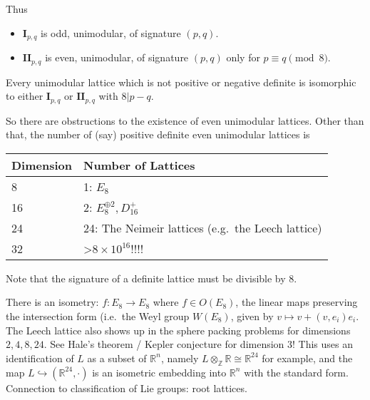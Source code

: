 \begin{remark}

Thus

\begin{itemize}
\tightlist
\item
  \(\mathbf{I}_{p, q}\) is odd, unimodular, of signature \((p, q)\).
\item
  \(\mathbf{II}_{p, q}\) is even, unimodular, of signature \((p, q)\)
  only for \(p \equiv q \pmod 8\).
\end{itemize}

\end{remark}

\begin{theorem}[Serre]

Every unimodular lattice which is not positive or negative definite is
isomorphic to either \(\mathbf{I}_{p, q}\) or \(\mathbf{II}_{p, q}\)
with \(8\mathrel{\Big|}p-q\).

\end{theorem}

\begin{remark}

So there are obstructions to the existence of even unimodular lattices.
Other than that, the number of (say) positive definite even unimodular
lattices is

\begin{longtable}[]{@{}ll@{}}
\toprule
Dimension & Number of Lattices \\
\midrule
\endhead
8 & 1: \(E_8\) \\
16 & 2: \(E_8^{\oplus 2}, D_{16}^+\) \\
24 & 24: The Neimeir lattices (e.g.~the Leech lattice) \\
32 & \textgreater{}\(8\times 10^{16}\)!!!! \\
\bottomrule
\end{longtable}

Note that the signature of a definite lattice must be divisible by 8.

\end{remark}

\begin{remark}

There is an isometry: \(f: E_8 \to E_8\) where \(f\in O(E_8)\), the
linear maps preserving the intersection form (i.e.~the Weyl group
\(W(E_8)\), given by \(v\mapsto v + (v, e_i) e_i\). The Leech lattice
also shows up in the sphere packing problems for dimensions
\(2,4,8,24\). See Hale's theorem / Kepler conjecture for dimension 3!
This uses an identification of \(L\) as a subset of \({\mathbb{R}}^n\),
namely \(L \otimes_{\mathbb{Z}}{\mathbb{R}}\cong {\mathbb{R}}^{24}\) for
example, and the map \(L \hookrightarrow({\mathbb{R}}^{24}, \cdot)\) is
an isometric embedding into \({\mathbb{R}}^n\) with the standard form.
Connection to classification of Lie groups: root lattices.

\end{remark}

